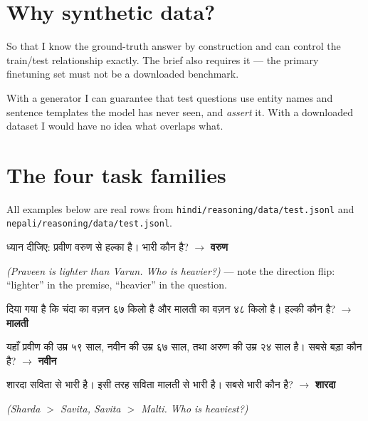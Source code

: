 \documentclass[11pt]{report}
\newcommand{\dn}[1]{{\devanagarifont #1}}
\begin{document}
\section{Why synthetic data?}

\begin{shortans}
So that I know the ground-truth answer by construction and can control the
train/test relationship exactly. The brief also requires it --- the primary
finetuning set must not be a downloaded benchmark.
\end{shortans}

\begin{deeper}
With a generator I can guarantee that test questions use entity names and
sentence templates the model has never seen, and \emph{assert} it. With a
downloaded dataset I would have no idea what overlaps what.
\end{deeper}

\section{The four task families}

All examples below are real rows from
\texttt{hindi/reasoning/data/test.jsonl} and
\texttt{nepali/reasoning/data/test.jsonl}.

\begin{vexample}
\dn{ध्यान दीजिए: प्रवीण वरुण से हल्का है। भारी कौन है?} $\rightarrow$
\textbf{\dn{वरुण}}

\smallskip
\textit{(Praveen is lighter than Varun. Who is heavier?)} --- note the direction
flip: ``lighter'' in the premise, ``heavier'' in the question.
\end{vexample}

\begin{vexample}
\dn{दिया गया है कि चंदा का वज़न ६७ किलो है और मालती का वज़न ४८ किलो है। हल्की कौन है?}
$\rightarrow$ \textbf{\dn{मालती}}
\end{vexample}

\begin{vexample}
\dn{यहाँ प्रवीण की उम्र ५९ साल, नवीन की उम्र ६७ साल, तथा अरुण की उम्र २४ साल है। सबसे बड़ा कौन है?}
$\rightarrow$ \textbf{\dn{नवीन}}
\end{vexample}

\begin{vexample}
\dn{शारदा सविता से भारी है। इसी तरह सविता मालती से भारी है। सबसे भारी कौन है?}
$\rightarrow$ \textbf{\dn{शारदा}}

\smallskip
\textit{(Sharda $>$ Savita, Savita $>$ Malti. Who is heaviest?)}
\end{vexample}
\end{document}
